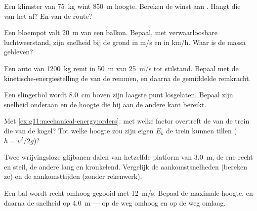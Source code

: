 \begin{exercise}[$\star$]\label{exo:g11:mechanical-energy:2}
Een klimster van \qty{75}{kg} wint \qty{850}{m} hoogte. Bereken de winst
aan . Hangt die van het  af? En van de
route?
\end{exercise}

\begin{exercise}[$\star$]\label{exo:g11:mechanical-energy:3}
Een bloempot valt \qty{20}{m} van een balkon. Bepaal, met verwaarloosbare
luchtweerstand, zijn snelheid bij de grond in \unit{m/s} en in
\unit{km/h}. Waar is de massa gebleven?
\end{exercise}

\begin{exercise}[$\star$]\label{exo:g11:mechanical-energy:4}
Een auto van \qty{1200}{kg} remt in \qty{50}{m} van \qty{25}{m/s} tot
stilstand. Bepaal met de kinetische-energiestelling de  van de
remmen, en daarna de gemiddelde remkracht.
\end{exercise}

\begin{exercise}[$\star$]\label{exo:g11:mechanical-energy:5}
Een slingerbol wordt \qty{8.0}{cm} boven zijn laagste punt losgelaten.
Bepaal zijn snelheid onderaan en de hoogte die hij aan de andere kant
bereikt.
\end{exercise}

\begin{exercise}[$\star\star$]\label{exo:g11:mechanical-energy:6}
Met \cref{ex:g11:mechanical-energy:orders}: met welke factor overtreft de
 van de trein die van de kogel? Tot welke hoogte zou
zijn eigen $E_k$ de trein kunnen tillen ($h = v^2/2g$)?
\end{exercise}

\begin{exercise}[$\star\star$]\label{exo:g11:mechanical-energy:7}
Twee wrijvingsloze glijbanen dalen van hetzelfde platform van
\qty{3.0}{m}, de ene recht en steil, de andere lang en kronkelend.
Vergelijk de aankomstsnelheden (bereken ze) en de aankomsttijden (zonder
rekenwerk).
\end{exercise}

\begin{exercise}[$\star\star$]\label{exo:g11:mechanical-energy:8}
Een bal wordt recht omhoog gegooid met \qty{12}{m/s}. Bepaal de maximale
hoogte, en daarna de snelheid op \qty{4.0}{m} --- op de weg omhoog en op
de weg omlaag.
\end{exercise}

